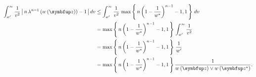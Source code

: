 \begin{proofEnd}
  \begin{align}
    \int_{w^{\prime}}^{\infty}  \frac{1}{v^2} \, \abs{ n \, \lambda^{n-1}\left(w\left(\vz\right)\right) - 1 } \, dv
    &\leq
    \int_{w^{\prime}}^{\infty}  \frac{1}{v^2} \, \max\left\{\, n \, {\left(1 - \frac{1}{w^*}\right)}^{n-1} - 1, 1 \,\right\}\, dv
    \\
    &=
    \max\left\{\, n \, {\left(1 - \frac{1}{w^*}\right)}^{n-1} - 1, 1 \,\right\}\,\int_{w^{\prime}}^{\infty}  \frac{1}{v^2}
    \\
    &=
    \max\left\{\, n \, {\left(1 - \frac{1}{w^*}\right)}^{n-1} - 1, 1 \,\right\} \, \frac{1}{w^{\prime}}
    \\
    &=
    \max\left\{\, n \, {\left(1 - \frac{1}{w^*}\right)}^{n-1} - 1, 1 \,\right\} \frac{1}{w\left(\vz\right) \vee w\left(\vz^*\right)}.
  \end{align}
  

\end{proofEnd}
